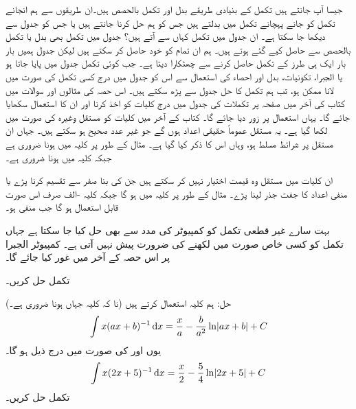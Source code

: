 جیسا آپ جانتے ہیں تکمل کے بنیادی طریقے بدل اور تکمل بالحصص ہیں۔ان طریقوں سے  ہم انجانے تکمل کو جانے پہچانے تکمل میں بدلتے ہیں جس کو ہم حل کرنا جانتے ہیں یا جس کو جدول سے دیکھا جا سکتا ہے۔ ان جدول میں تکمل کہاں سے آتے ہیں؟ جدول میں تکمل بھی بدل یا تکمل بالحصص سے حاصل کیے گئے ہوتے ہیں۔ ہم ان تمام کو خود حاصل کر سکتے ہیں لیکن جدول ہمیں بار بار ایک ہی طرز کے تکمل حاصل کرنے سے چھٹکارا دیتا ہے۔ جب کوئی تکمل جدول میں پایا جاتا ہو یا الجبرا، تکونیات، بدل اور احصاء کی استعمال سے اس کو جدول میں درج کسی تکمل کی صورت میں لانا ممکن ہو، تب ہم تکمل کا حل جدول سے پڑھ سکتے ہیں۔ اس حصہ کی مثالوں اور سوالات میں  کتاب کی آخر میں صفحہ  پر تکملات کی جدول میں درج کلیات کو اخذ کرنا اور ان کا استعمال سکھایا جائے گا۔ یہاں استعمال پر زور دیا جائے گا۔ کتاب کے آخر میں کلیات کو مستقل   وغیرہ کی صورت میں لکھا گیا ہے۔ یہ مستقل عموماً حقیقی اعداد ہوں گے جو غیر عدد صحیح ہو سکتے ہیں۔ جہاں ان مستقل پر شرائط مسلط ہو، وہاں اس کا ذکر کیا گیا ہے۔ مثال کے طور پر کلیہ  میں  ہونا ضروری ہے جبکہ کلیہ   میں  ہونا ضروری ہے۔ 

ان کلیات میں  مستقل وہ قیمت اختیار نہیں کر سکتے ہیں جن کی بنا صفر سے تقسیم کرنا پڑے یا منفی اعداد کا جفت جذر لینا پڑے۔ مثال کے طور پر کلیہ  میں  ہو گا جبکہ کلیہ -الف صرف اس صورت قابل استعمال ہو گا جب  منفی ہو۔ 

بہت سارے غیر قطعی تکمل کو کمپیوٹر کی مدد سے بھی حل کیا جا سکتا ہے جہاں تکمل کو کسی خاص صورت میں لکھنے کی ضرورت پیش نہیں آتی ہے۔ کمپیوٹر الجبرا پر اس حصہ کے آخر میں غور کیا جائے گا۔

تکمل  حل کریں۔

حل:\quad
ہم کلیہ  استعمال کرتے ہیں (نا کہ کلیہ  جہاں  ہونا ضروری ہے۔)
\begin{align*}
\int x(ax+b)^{-1}\dif x=\frac{x}{a}-\frac{b}{a^2}\ln\abs{ax+b}+C
\end{align*}
یوں  اور  کی صورت میں درج ذیل ہو گا۔
\begin{align*}
\int x(2x+5)^{-1}\dif x=\frac{x}{2}-\frac{5}{4}\ln\abs{2x+5}+C
\end{align*}
تکمل  حل کریں۔


